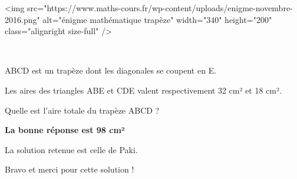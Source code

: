 
%
<img src="https://www.maths-cours.fr/wp-content/uploads/enigme-novembre-2016.png" alt="énigme mathématique trapèze" width="340" height="200" class="alignright size-full" />
\par
[Connaissances requises : à partir de la troisième]
\par
~
\par
ABCD est un trapèze dont les diagonales se coupent en E.
\par
Les aires des triangles ABE et CDE valent respectivement 32 cm² et 18 cm².
\par
Quelle est l'aire totale du trapèze ABCD ?
\begin{solution}

     \textbf{La bonne réponse est 98 cm²}
\par
     La solution retenue est celle de Paki.
     \par
     Bravo et merci pour cette solution !
     \par
     [slider name=enigme-12-16]
     \par
     [pdf-embedder url="/wp-content/uploads/slides/enigme-12-16/1.pdf" width="676"]
\end{solution}
